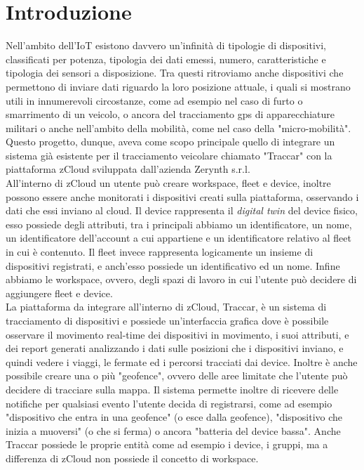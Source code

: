 \documentclass[a4paper,titlepage,12pt]{report}
\begin{document}
{\chapter{
Introduzione}
Nell'ambito dell'IoT esistono davvero un'infinità di tipologie di dispositivi, classificati per potenza, tipologia dei dati emessi, numero, caratteristiche e tipologia dei sensori a disposizione. Tra questi ritroviamo anche dispositivi che permettono di inviare dati riguardo la loro posizione attuale, i quali si mostrano utili in innumerevoli circostanze, come ad esempio nel caso di furto o smarrimento di un veicolo, o ancora del tracciamento gps di apparecchiature militari o anche nell'ambito della mobilità, come nel caso della "micro-mobilità".\\
Questo progetto, dunque, aveva come scopo principale quello di integrare un sistema già esistente per il tracciamento veicolare chiamato "Traccar"  con la piattaforma zCloud sviluppata dall'azienda Zerynth s.r.l.\\
All'interno di zCloud un utente può creare workspace, fleet e device, inoltre possono essere anche monitorati i dispositivi creati sulla piattaforma, osservando i dati che essi inviano al cloud. Il device rappresenta il \textit{digital twin} del device fisico, esso possiede degli attributi, tra i principali abbiamo un identificatore, un nome, un identificatore dell'account a cui appartiene e un identificatore relativo al fleet in cui è contenuto. Il fleet invece rappresenta logicamente un insieme di dispositivi registrati, e anch'esso possiede un identificativo ed un nome. Infine abbiamo le workspace, ovvero, degli spazi di lavoro in cui l'utente può decidere di aggiungere fleet e device.\\
La piattaforma da integrare all'interno di zCloud, Traccar, è un sistema di tracciamento di dispositivi e possiede un'interfaccia grafica dove è possibile osservare il movimento real-time dei dispositivi in movimento, i suoi attributi, e dei report generati analizzando i dati sulle posizioni che i dispositivi inviano, e quindi vedere i viaggi, le fermate ed i percorsi tracciati dai device. Inoltre è anche possibile creare una o più "geofence", ovvero delle aree limitate che l'utente può decidere di tracciare sulla mappa. Il sistema permette inoltre di ricevere delle notifiche per qualsiasi evento l'utente decida di registrarsi, come ad esempio "dispositivo che entra in una geofence" (o esce dalla geofence), "dispositivo che inizia a muoversi" (o che si ferma) o ancora "batteria del device bassa". Anche Traccar possiede le proprie entità come ad esempio i device, i gruppi, ma a differenza di zCloud non possiede il concetto di workspace.\\
}
\end{document}
